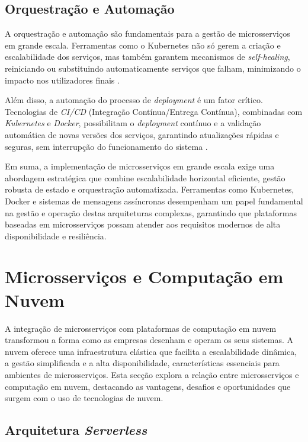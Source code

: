 \subsection{Orquestração e Automação}

A orquestração e automação são fundamentais para a gestão de microsserviços em grande escala. Ferramentas como o Kubernetes não só gerem a criação e escalabilidade dos serviços, mas também garantem mecanismos de \textit{self-healing}, reiniciando ou substituindo automaticamente serviços que falham, minimizando o impacto nos utilizadores finais \cite{Burns2016}. 

Além disso, a automação do processo de \textit{deployment} é um fator crítico. Tecnologias de \textit{CI/CD} (Integração Contínua/Entrega Contínua), combinadas com \textit{ Kubernetes} e \textit{ Docker}, possibilitam o \textit{deployment} contínuo e a validação automática de novas versões dos serviços, garantindo atualizações rápidas e seguras, sem interrupção do funcionamento do sistema \cite{Taherizadeh2020}.

Em suma, a implementação de microsserviços em grande escala exige uma abordagem estratégica que combine escalabilidade horizontal eficiente, gestão robusta de estado e orquestração automatizada. Ferramentas como Kubernetes, Docker e sistemas de mensagens assíncronas desempenham um papel fundamental na gestão e operação destas arquiteturas complexas, garantindo que plataformas baseadas em microsserviços possam atender aos requisitos modernos de alta disponibilidade e resiliência.

\clearpage

\section{Microsserviços e Computação em Nuvem}

A integração de microsserviços com plataformas de computação em nuvem transformou a forma como as empresas desenham e operam os seus sistemas. A nuvem oferece uma infraestrutura elástica que facilita a escalabilidade dinâmica, a gestão simplificada e a alta disponibilidade, características essenciais para ambientes de microsserviços. Esta secção explora a relação entre microsserviços e computação em nuvem, destacando as vantagens, desafios e oportunidades que surgem com o uso de tecnologias de nuvem.

\subsection{Arquitetura \textit{Serverless}}

